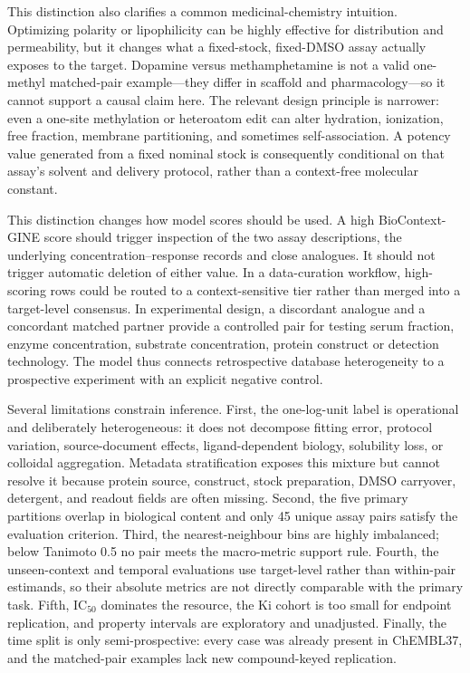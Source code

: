 \documentclass[letterpaper]{article}
\begin{document}
This distinction also clarifies a common medicinal-chemistry intuition. Optimizing polarity or lipophilicity can be highly effective for distribution and permeability, but it changes what a fixed-stock, fixed-DMSO assay actually exposes to the target. Dopamine versus methamphetamine is not a valid one-methyl matched-pair example---they differ in scaffold and pharmacology---so it cannot support a causal claim here. The relevant design principle is narrower: even a one-site methylation or heteroatom edit can alter hydration, ionization, free fraction, membrane partitioning, and sometimes self-association. A potency value generated from a fixed nominal stock is consequently conditional on that assay's solvent and delivery protocol, rather than a context-free molecular constant.

This distinction changes how model scores should be used. A high BioContext-GINE score should trigger inspection of the two assay descriptions, the underlying concentration--response records and close analogues. It should not trigger automatic deletion of either value. In a data-curation workflow, high-scoring rows could be routed to a context-sensitive tier rather than merged into a target-level consensus. In experimental design, a discordant analogue and a concordant matched partner provide a controlled pair for testing serum fraction, enzyme concentration, substrate concentration, protein construct or detection technology. The model thus connects retrospective database heterogeneity to a prospective experiment with an explicit negative control.

Several limitations constrain inference. First, the one-log-unit label is operational and deliberately heterogeneous: it does not decompose fitting error, protocol variation, source-document effects, ligand-dependent biology, solubility loss, or colloidal aggregation. Metadata stratification exposes this mixture but cannot resolve it because protein source, construct, stock preparation, DMSO carryover, detergent, and readout fields are often missing. Second, the five primary partitions overlap in biological content and only 45 unique assay pairs satisfy the evaluation criterion. Third, the nearest-neighbour bins are highly imbalanced; below Tanimoto 0.5 no pair meets the macro-metric support rule. Fourth, the unseen-context and temporal evaluations use target-level rather than within-pair estimands, so their absolute metrics are not directly comparable with the primary task. Fifth, IC$_{50}$ dominates the resource, the Ki cohort is too small for endpoint replication, and property intervals are exploratory and unadjusted. Finally, the time split is only semi-prospective: every case was already present in ChEMBL37, and the matched-pair examples lack new compound-keyed replication.
\end{document}
